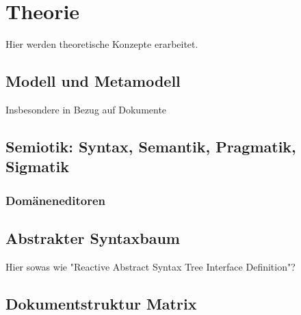 




\chapter{Theorie}

Hier werden theoretische Konzepte erarbeitet.

\section{Modell und Metamodell}

Insbesondere in Bezug auf Dokumente

\section{Semiotik: Syntax, Semantik, Pragmatik, Sigmatik}

\subsection{Domäneneditoren}

\section{Abstrakter Syntaxbaum}

Hier sowas wie "Reactive Abstract Syntax Tree Interface Definition"?

\section{Dokumentstruktur Matrix}

